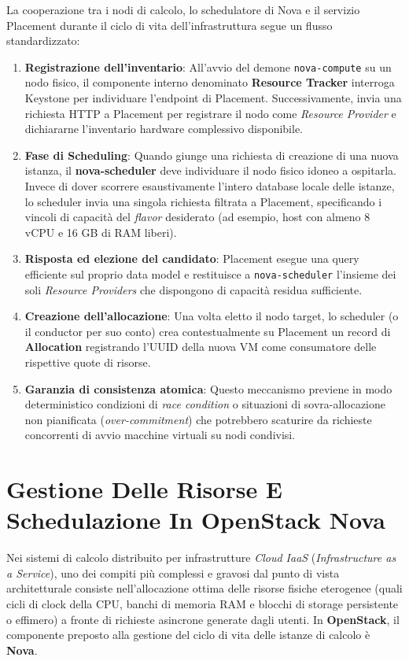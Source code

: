 \documentclass[11pt, a4paper]{article}
\begin{document}
La cooperazione tra i nodi di calcolo, lo schedulatore di Nova e il servizio Placement durante il ciclo di vita dell'infrastruttura segue un flusso standardizzato:
\begin{enumerate}
    \item \textbf{Registrazione dell'inventario}: All'avvio del demone \texttt{nova-compute} su un nodo fisico, il componente interno denominato \textbf{Resource Tracker} interroga Keystone per individuare l'endpoint di Placement. Successivamente, invia una richiesta HTTP a Placement per registrare il nodo come \emph{Resource Provider} e dichiararne l'inventario hardware complessivo disponibile.
    \item \textbf{Fase di Scheduling}: Quando giunge una richiesta di creazione di una nuova istanza, il \textbf{nova-scheduler} deve individuare il nodo fisico idoneo a ospitarla. Invece di dover scorrere esaustivamente l'intero database locale delle istanze, lo scheduler invia una singola richiesta filtrata a Placement, specificando i vincoli di capacità del \emph{flavor} desiderato (ad esempio, host con almeno 8 vCPU e 16 GB di RAM liberi).
    \item \textbf{Risposta ed elezione del candidato}: Placement esegue una query efficiente sul proprio data model e restituisce a \texttt{nova-scheduler} l'insieme dei soli \emph{Resource Providers} che dispongono di capacità residua sufficiente.
    \item \textbf{Creazione dell'allocazione}: Una volta eletto il nodo target, lo scheduler (o il conductor per suo conto) crea contestualmente su Placement un record di \textbf{Allocation} registrando l'UUID della nuova VM come consumatore delle rispettive quote di risorse.
    \item \textbf{Garanzia di consistenza atomica}: Questo meccanismo previene in modo deterministico condizioni di \emph{race condition} o situazioni di sovra-allocazione non pianificata (\emph{over-commitment}) che potrebbero scaturire da richieste concorrenti di avvio macchine virtuali su nodi condivisi.
\end{enumerate}


\section{Gestione Delle Risorse E Schedulazione In OpenStack Nova}

Nei sistemi di calcolo distribuito per infrastrutture \emph{Cloud IaaS} (\emph{Infrastructure as a Service}), uno dei compiti più complessi e gravosi dal punto di vista architetturale consiste nell'allocazione ottima delle risorse fisiche eterogenee (quali cicli di clock della CPU, banchi di memoria RAM e blocchi di storage persistente o effimero) a fronte di richieste asincrone generate dagli utenti. In \textbf{OpenStack}, il componente preposto alla gestione del ciclo di vita delle istanze di calcolo è \textbf{Nova}.
\end{document}

